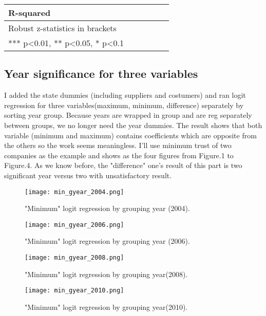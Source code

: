 \documentclass[a4paper]{article}
\begin{document}
\begin{table}[htbp]
\begin{tabular}{lrrrrr}
    R-squared & \multicolumn{1}{c}{} & \multicolumn{1}{c}{} & \multicolumn{1}{c}{} & \multicolumn{1}{c}{} & \multicolumn{1}{c}{} \\
    \midrule
    Robust z-statistics in brackets &       &       &       &       &  \\
    *** p<0.01, ** p<0.05, * p<0.1 &       &       &       &       &  \\
    \end{tabular}%
  \label{tab:addlabel}%
\end{table}%





\subsection{Year significance for three variables}
I added the state dummies (including suppliers and costumers) and ran logit regression for three variables(maximum, minimum, difference) separately by sorting year group. Because years are wrapped in group and are reg separately between groups, we no longer need the year dummies. The result shows that both variable (minimum and maximum) contains coefficients which are opposite from the others so the work seems meaningless. I'll use minimum trust of two companies as the example and shows as the four figures from Figure.1 to Figure.4. As we know before, the "difference" one's result of this part is two significant year versus two with unsatisfactory result.

\begin{figure}[!htb] 
\centering
\texttt{[image: min\_gyear\_2004.png]}
\caption{\label{fig:min_gyeasr_2004} "Minimum" logit regression by grouping year (2004).}
\end{figure}

\begin{figure}[!htb] 
\centering
\texttt{[image: min\_gyear\_2006.png]}
\caption{\label{fig:min_gyear_2006} "Minimum" logit regression by grouping year (2006).}
\end{figure}

\begin{figure}[!htb] 
\centering
\texttt{[image: min\_gyear\_2008.png]}
\caption{\label{fig:min_gyear_2008} "Minimum" logit regression by grouping year(2008).}
\end{figure}

\begin{figure}[!htb] 
\centering
\texttt{[image: min\_gyear\_2010.png]}
\caption{\label{fig:min_gyear_2010} "Minimum" logit regression by grouping year(2010).}
\end{figure}
\end{document}
